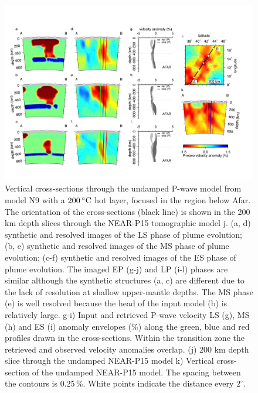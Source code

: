 \documentclass[a4paper,10pt,twocolumn]{paper}
\begin{document}
\begin{figure}
\centering
\includegraphics[width=16cm]{../figures-working/fig09.png}
\caption{Vertical cross-sections through the undamped P-wave model from model N9 with a $200\rm\,^{\circ}C$ hot layer, focused in the region below Afar.  The orientation of the cross-sections (black line) is shown in the 200 km depth slices through the NEAR-P15 tomographic model  j. (a, d) synthetic and resolved images of the LS phase of plume evolution; (b, e) synthetic and resolved images of the MS phase of plume evolution; (c-f) synthetic and resolved images of the ES phase of plume evolution. The imaged EP (g-j) and LP (i-l) phases are similar although the synthetic structures (a, c) are different due to the lack of resolution at shallow upper-mantle depths. The MS phase (e) is well resolved because the head of the input model (b) is relatively large. g-i) Input and retrieved P-wave velocity LS (g), MS (h) and ES (i) anomaly envelopes (\%) along the green, blue and red profiles drawn in the cross-sections. Within the transition zone the retrieved and observed velocity anomalies overlap. (j) 200 km depth slice through the undamped NEAR-P15 model k) Vertical cross-section of the undamped NEAR-P15 model. The spacing between the contours is 0.25\,\%. White points indicate the distance every $2^{\circ}$.}
\label{fg:8}
\end{figure}
\end{document}
